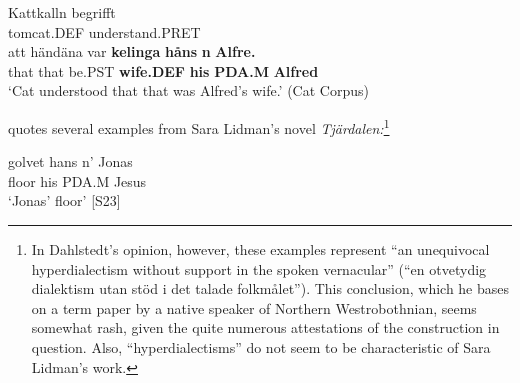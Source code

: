 

 \ea\label{}
\gll Kattkalln  begrifft\\


tomcat.DEF  understand.PRET\\

 \ea\label{}
\gll att  händäna  var  \textbf{kelinga}\textbf{  håns}\textbf{  n}\textbf{  Alfre.}\\


that  that  be.PST  \textbf{wife.DEF} \textbf{his} \textbf{PDA.M} \textbf{Alfred}\\

\glt  ‘Cat understood that that was Alfred’s wife.’ (Cat Corpus)

\z

\citet[51]{Dahlstedt1971} quotes several examples from Sara Lidman’s novel \textit{Tjärdalen}\textit{:}\footnote{ In Dahlstedt’s opinion, however, these examples represent “an unequivocal hyperdialectism without support in the spoken vernacular” (“en otvetydig dialektism utan stöd i det talade folkmålet”). This conclusion, which he bases on a term paper by a native speaker of Northern Westrobothnian, seems somewhat rash, given the quite numerous attestations of the construction in question. Also, “hyperdialectisms” do not seem to be characteristic of Sara Lidman’s work.\par }


\item 


\item 


 \ea\label{}
\gll golvet  hans  n’  Jonas\\


floor  his  PDA.M  Jesus\\

\glt  ‘Jonas’ floor’ [S23]

